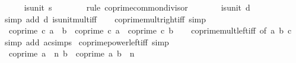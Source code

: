 \begin{isabellebody}
\ \ \ \ \isamarkupfalse%
\ {\isachardoublequoteopen}is{\isacharunderscore}{\kern0pt}unit\ s{\isachardoublequoteclose}\isanewline
\ \ \ \ \ \ \isamarkupfalse%
\ {\isacharparenleft}{\kern0pt}rule\ coprime{\isacharunderscore}{\kern0pt}common{\isacharunderscore}{\kern0pt}divisor{\isacharparenright}{\kern0pt}\isanewline
\ \ \ \ \isamarkupfalse%
\ \isamarkupfalse%
\ {\isachardoublequoteopen}is{\isacharunderscore}{\kern0pt}unit\ d{\isachardoublequoteclose}\isanewline
\ \ \ \ \ \ \isamarkupfalse%
\ {\isacharparenleft}{\kern0pt}simp\ add{\isacharcolon}{\kern0pt}\ d\ is{\isacharunderscore}{\kern0pt}unit{\isacharunderscore}{\kern0pt}mult{\isacharunderscore}{\kern0pt}iff{\isacharparenright}{\kern0pt}\isanewline
\ \ \isamarkupfalse%
\isanewline
{}\isamarkupfalse%
%
\endisatagproof
{\isafoldproof}%
%
\isadelimproof
\isanewline
%
\endisadelimproof
\isanewline
{}\isamarkupfalse%
\ coprime{\isacharunderscore}{\kern0pt}mult{\isacharunderscore}{\kern0pt}right{\isacharunderscore}{\kern0pt}iff\ {\isacharbrackleft}{\kern0pt}simp{\isacharbrackright}{\kern0pt}{\isacharcolon}{\kern0pt}\isanewline
\ \ {\isachardoublequoteopen}coprime\ c\ {\isacharparenleft}{\kern0pt}a\ {\isacharasterisk}{\kern0pt}\ b{\isacharparenright}{\kern0pt}\ {\isasymlongleftrightarrow}\ coprime\ c\ a\ {\isasymand}\ coprime\ c\ b{\isachardoublequoteclose}\isanewline
%
\isadelimproof
\ \ %
\endisadelimproof
%
\isatagproof
{}\isamarkupfalse%
\ coprime{\isacharunderscore}{\kern0pt}mult{\isacharunderscore}{\kern0pt}left{\isacharunderscore}{\kern0pt}iff\ {\isacharbrackleft}{\kern0pt}of\ a\ b\ c{\isacharbrackright}{\kern0pt}\ \isamarkupfalse%
\ {\isacharparenleft}{\kern0pt}simp\ add{\isacharcolon}{\kern0pt}\ ac{\isacharunderscore}{\kern0pt}simps{\isacharparenright}{\kern0pt}%
\endisatagproof
{\isafoldproof}%
%
\isadelimproof
\isanewline
%
\endisadelimproof
\isanewline
{}\isamarkupfalse%
\ coprime{\isacharunderscore}{\kern0pt}power{\isacharunderscore}{\kern0pt}left{\isacharunderscore}{\kern0pt}iff\ {\isacharbrackleft}{\kern0pt}simp{\isacharbrackright}{\kern0pt}{\isacharcolon}{\kern0pt}\isanewline
\ \ {\isachardoublequoteopen}coprime\ {\isacharparenleft}{\kern0pt}a\ {\isacharcircum}{\kern0pt}\ n{\isacharparenright}{\kern0pt}\ b\ {\isasymlongleftrightarrow}\ coprime\ a\ b\ {\isasymor}\ n\ {\isacharequal}{\kern0pt}\ {}{\isachardoublequoteclose}\isanewline
%
\isadelimproof
%
\endisadelimproof
%
\isatagproof
{}\isamarkupfalse%

\end{isabellebody}
